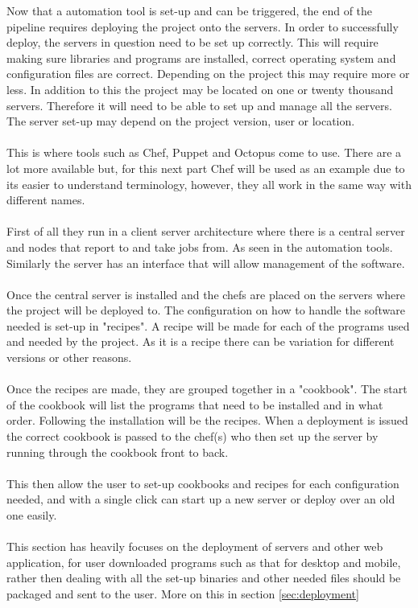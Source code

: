 Now that a automation tool is set-up and can be triggered, the end of the pipeline requires deploying the project onto the servers. In order to successfully deploy, the servers in question need to be set up correctly. This will require making sure libraries and programs are installed, correct operating system and configuration files are correct. Depending on the project this may require more or less.  In addition to this the project may be located on one or twenty thousand servers. Therefore it will need to be able to set up and manage all the servers. The server set-up may depend on the project version, user or location. 
\\\\
This is where tools such as Chef, Puppet and Octopus come to use. There are a lot more available but, for this next part Chef will be used as an example due to its easier to understand terminology, however, they all work in the same way with different names.
\\\\
First of all they run in a client server architecture where there is a central server and nodes that report to and take jobs from. As seen in the automation tools. Similarly the server has an interface that will allow management of the software.
\\\\
Once the central server is installed and the chefs are placed on the servers where the project will be deployed to. The configuration on how to handle the software needed is set-up in "recipes". A recipe will be made for each of the programs used and needed by the project. As it is a recipe there can be variation for different versions or other reasons.
\\\\
Once the recipes are made, they are grouped together in a "cookbook". The start of the cookbook will list the programs that need to be installed and in what order. Following the installation will be the recipes. When a deployment is issued the correct cookbook is passed to the chef(s) who then set up the server by running through the cookbook front to back.
\\\\
This then allow the user to set-up cookbooks and recipes for each configuration needed, and with a single click can start up a new server or deploy over an old one easily.
\\\\
This section has heavily focuses on the deployment of servers and other web application, for user downloaded programs such as that for desktop and mobile, rather then dealing with all the set-up binaries and other needed files should be packaged and sent to the user. More on this in section \ref{sec:deployment}
 

